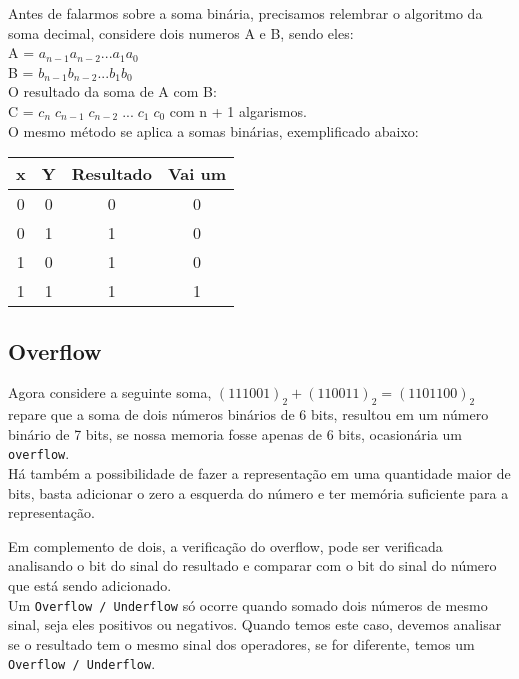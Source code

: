 \documentclass[12pt, onecolumn]{article}
\begin{document}
	Antes de falarmos sobre a soma binária, precisamos relembrar o algoritmo da
	soma decimal, considere dois numeros A e B, sendo eles:\\
	\newline
	A = $a_{n-1} a_{n-2} ... a_1 a_0$\\
	B = $b_{n-1} b_{n-2} ... b_1 b_0$\\
	\newline
	O resultado da soma de A com B:\\
	\newline
	C = ${c_n}\;c_{n-1}\;c_{n-2}\;...\;c_{1}\;c_{0}$ com n + 1 algarismos. \\
	\newline
	O mesmo método se aplica a somas binárias, exemplificado abaixo:
	\begin{table}[h]
		\centering
		\begin{tabular}{|c|c|c|c|}
			\hline
			x & Y & Resultado & Vai um \\ \hline
			0 & 0 & 0 & 0 \\ \hline
			0 & 1 & 1 & 0 \\ \hline
			1 & 0 & 1 & 0 \\ \hline
			1 & 1 & 1 & 1 \\ \hline
		\end{tabular}
	\end{table}
	
			\subsection{\centering Overflow}

	Agora considere a seguinte soma, $(111001)_2 + (110011)_2 = (1101100)_2$ 
	repare que a soma de dois números binários de 6 bits, resultou em um número
	binário de 7 bits, se nossa memoria fosse apenas de 6 bits, ocasionária um 
	\texttt{overflow}. \\
	\newline
	Há também a possibilidade de fazer a representação em uma quantidade maior de
	bits, basta adicionar o zero a esquerda do número e ter memória suficiente 
	para a representação.

	Em complemento de dois, a verificação do overflow, pode ser verificada
	analisando o bit do sinal do resultado e comparar com o bit do sinal
	do número que está sendo adicionado.\\
	\newline
	Um \texttt{Overflow / Underflow} só ocorre quando somado dois números de 
	mesmo sinal, seja eles positivos ou negativos. Quando temos este caso, 
	devemos analisar se o resultado tem o mesmo sinal dos operadores, se for
	diferente, temos um \texttt{Overflow / Underflow}.
\end{document}
